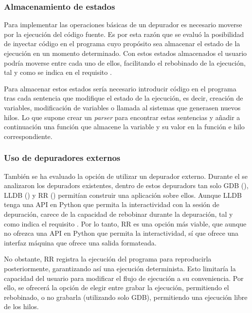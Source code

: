 \subsubsection{Almacenamiento de estados} \label{subsec:almacenamiento-estados}

Para implementar las operaciones básicas de un \gls{depurador} es necesario moverse por la ejecución del \gls{código fuente}. Es por esta razón que se evaluó la posibilidad de \gls{inyectar código} en el programa cuyo propósito sea almacenar el estado de la ejecución en un momento determinado. Con estos estados almacenados el usuario podría moverse entre cada uno de ellos, facilitando el rebobinado de la ejecución, tal y como se indica en el requisito .

Para almacenar estos estados sería necesario introducir código en el programa tras cada \gls{sentencia} que modifique el estado de la ejecución, es decir, creación de variables, modificación de variables o \glspl{llamada al sistema} que generasen nuevos \glspl{hilo}. Lo que supone crear un \textit{\gls{parser}} para encontrar estas \glspl{sentencia} y añadir a continuación una función que almacene la variable y su valor en la función e \gls{hilo} correspondiente.

\subsubsection{Uso de depuradores externos} \label{subsec:depuradores-externos}

También se ha evaluado la opción de utilizar un depurador externo. Durante el  se analizaron los \glspl{depurador} existentes, dentro de estos \glspl{depurador} tan solo GDB (), LLDB () y RR () permitían construir una aplicación sobre ellos. Aunque LLDB tenga una \gls{API} en Python que permita la interactividad con la sesión de depuración, carece de la capacidad de rebobinar durante la depuración, tal y como indica el requisito . Por lo tanto, RR es una opción más viable, que aunque no ofrezca una \gls{API} en Python que permita la interactividad, sí que ofrece una interfaz máquina que ofrece una salida formateada.

No obstante, RR registra la ejecución del programa para reproducirla posteriormente, garantizando así una ejecución determinista. Esto limitaría la capacidad del usuario para modificar el flujo de ejecución a su conveniencia. Por ello, se ofrecerá la opción de elegir entre grabar la ejecución, permitiendo el rebobinado, o no grabarla (utilizando solo GDB), permitiendo una ejecución libre de los \glspl{hilo}.

